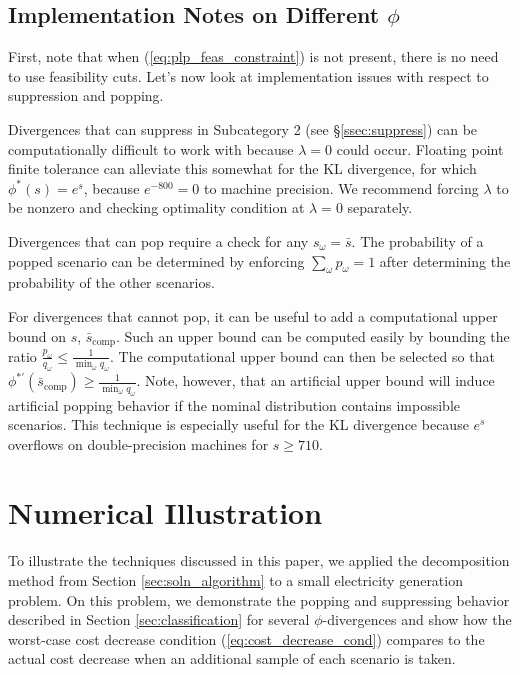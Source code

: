 \documentclass[12pt]{article}
\theoremstyle{plain}
\theoremstyle{definition}
\theoremstyle{remark}
\begin{document}
\subsection{Implementation Notes on Different $\phi$}
\label{ssec:implement}

First, note that when (\ref{eq:plp_feas_constraint}) is not present, there is no need to use feasibility cuts. Let's now look at implementation issues with respect to suppression and popping. 

Divergences that can suppress in Subcategory 2 (see \S \ref{ssec:suppress}) can be computationally difficult to work with because $\lambda = 0$ could occur.
Floating point finite tolerance can alleviate this somewhat for the KL divergence, for which $\phi^*(s) = e^s$, because $e^{-800} = 0$ to machine precision.
We recommend forcing $\lambda$ to be nonzero and checking optimality condition at $\lambda = 0$ separately.

Divergences that can pop require a check for any $s_\omega = \bar{s}$.
The probability of a popped scenario can be determined by enforcing $\sum_\omega p_\omega = 1$ after determining the probability of the other scenarios.

For divergences that cannot pop, it can be useful to add a computational upper bound on $s$, $\bar{s}_\text{comp}$.
Such an upper bound can be computed easily by bounding the ratio $\frac{p_\omega}{q_\omega} \leq \frac{1}{\min_\omega q_\omega}$.
The computational upper bound can then be selected so that $\phi^{*\prime}(\bar{s}_\text{comp}) \geq \frac{1}{\min_\omega q_\omega}$.
Note, however, that an artificial upper bound will induce artificial popping behavior if the nominal distribution contains impossible scenarios.
This technique is especially useful for the KL divergence because $e^s$ overflows on double-precision machines for $s \geq 710$.



\section{Numerical Illustration} \label{sec:comp_results}

To illustrate the techniques discussed in this paper, we applied the decomposition method from Section \ref{sec:soln_algorithm} to a small electricity generation problem.
On this problem, we demonstrate the popping and suppressing behavior described in Section \ref{sec:classification} for several $\phi$-divergences and show how the worst-case cost decrease condition (\ref{eq:cost_decrease_cond}) compares to the actual cost decrease when an additional sample of each scenario is taken.
\end{document}

